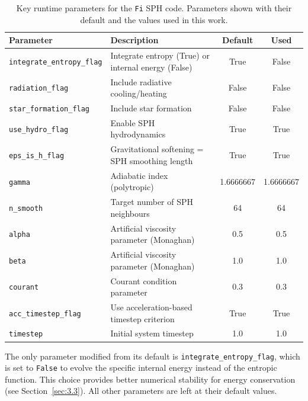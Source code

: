\begin{table}[!ht]
	\centering
	\begin{threeparttable}
		\begin{tabular}{l p{5.5cm} c c}
			\hline
			\rowcolor[gray]{0.8}
			\textbf{Parameter} & \textbf{Description} & \textbf{Default} & \textbf{Used} \\
			\hline
			\texttt{integrate\_entropy\_flag} & Integrate entropy (True) or internal energy (False) & True & False \\
			\texttt{radiation\_flag} & Include radiative cooling/heating & False & False \\
			\texttt{star\_formation\_flag} & Include star formation & False & False \\
			\texttt{use\_hydro\_flag} & Enable SPH hydrodynamics & True & True \\
			\texttt{eps\_is\_h\_flag} & Gravitational softening = SPH smoothing length & True & True \\
			\texttt{gamma} & Adiabatic index (polytropic) & 1.6666667 & 1.6666667 \\
			\texttt{n\_smooth} & Target number of SPH neighbours & 64 & 64 \\
			\texttt{alpha} & Artificial viscosity parameter (Monaghan) & 0.5 & 0.5 \\
			\texttt{beta} & Artificial viscosity parameter (Monaghan) & 1.0 & 1.0 \\
			\texttt{courant} & Courant condition parameter & 0.3 & 0.3 \\
			\texttt{acc\_timestep\_flag} & Use acceleration-based timestep criterion & True & True \\
			\texttt{timestep} & Initial system timestep & 1.0 & 1.0 \\
			\hline
		\end{tabular}
		\begin{tablenotes}
			\item The only parameter modified from its default is \texttt{integrate\_entropy\_flag}, which is set to \texttt{False} to evolve the specific internal energy instead of the entropic function. This choice provides better numerical stability for energy conservation (see Section~\ref{sec:3.3}). All other parameters are left at their default values.
		\end{tablenotes}
	\end{threeparttable}
	\caption{Key runtime parameters for the \texttt{Fi} SPH code. Parameters shown with their default and the values used in this work.}
	\label{tab:fi_parameters}
\end{table}

